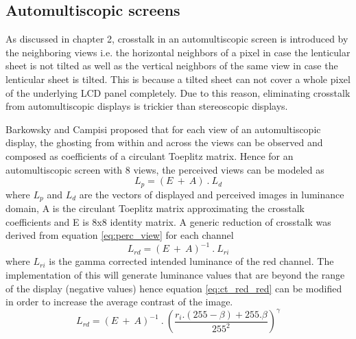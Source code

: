 \subsection{Automultiscopic screens}
As discussed in chapter 2, crosstalk in an automultiscopic screen is introduced by the neighboring views i.e. the horizontal neighbors of a pixel in case the lenticular sheet is not tilted as well as the vertical neighbors of the same view in case the lenticular sheet is tilted. This is because a tilted sheet can not cover a whole pixel of the underlying LCD panel completely. Due to this reason, eliminating crosstalk from automultiscopic displays is trickier than stereoscopic displays.

Barkowsky and Campisi \cite{barkowsky2010crosstalk} proposed that for each view of an automultiscopic display, the ghosting from within and across the views can be observed and composed as coefficients of a circulant Toeplitz matrix. Hence for an automultiscopic screen with 8 views, the perceived views can be modeled as
\begin{equation}
L_p = (E\:+\:A)\:.\:L_d
\label{eq:perc_view}
\end{equation}
where $L_p$ and $L_d$ are the vectors of displayed and perceived images in luminance domain, A is the circulant Toeplitz matrix approximating the crosstalk coefficients and E is 8x8 identity matrix. A generic reduction of crosstalk was derived from equation \ref{eq:perc_view} for each channel
\begin{equation}
L_{rd} = (E\:+\:A)^{-1}\:.\:L_{ri}
\label{eq:ct_red_red}
\end{equation}
where $L_{ri}$ is the gamma corrected intended luminance of the red channel. The implementation of this will generate luminance values that are beyond the range of the display (negative values) hence equation \ref{eq:ct_red_red} can be modified in order to increase the average contrast of the image.
\begin{equation}
L_{rd} = (E\:+\:A)^{-1}\:.\:\left(\frac{r_i.(255-\beta)+255.\beta}{255^2}\right)^{\gamma}
\label{eq:ct_red_reduced_contrast}
\end{equation}
